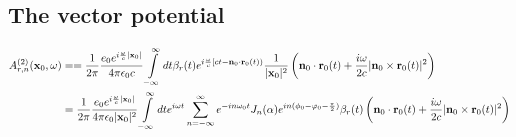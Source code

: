 \subsection{The vector potential}

\begin{align}
    A^{(2)}_{r,n}({\bf x}_0,\omega) & = =\frac1{2\pi}\frac{e_0 e^{i\frac{\omega}c|{\bf x}_0|}}{4\pi\epsilon_0c}\int\limits_{-\infty}^{\infty}dt\beta_r(t)e^{i\frac{\omega}c\left[ct-{\bf n}_0\cdot{\bf r}_0(t)\right)} \frac1{|{\bf x}_0|^2}\left({{\bf n}_0\cdot{\bf r}_0(t)}+\frac{i\omega}{2c}{|{\bf n}_0\times{\bf r}_0(t)|^2} \right)\nonumber                                \\
                                    & =\frac1{2\pi}\frac{e_0 e^{i\frac{\omega}c|{\bf x}_0|}}{4\pi\epsilon_0|{\bf x}_0|^2}\int\limits_{-\infty}^{\infty}dte^{i\omega t}\sum\limits_{n=-\infty}^{\infty} e^{-i n \omega_0 t}J_n(\alpha) e^{in(\phi_0-\varphi_0-\frac{\pi}2)}\beta_r(t)\left({{\bf n}_0\cdot{\bf r}_0(t)}+\frac{i\omega}{2c}{|{\bf n}_0\times{\bf r}_0(t)|^2} \right)
\end{align}